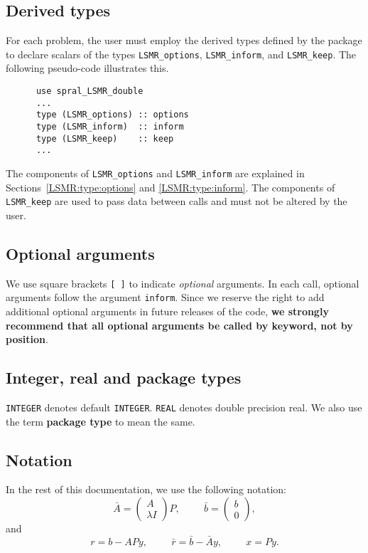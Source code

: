 \subsection{Derived types}

For each problem, the user must employ the derived types defined by the
package to declare scalars of the types
{\tt LSMR\_options}, {\tt LSMR\_inform}, and {\tt LSMR\_keep}.
The following pseudo-code illustrates this.
\begin{verbatim}
      use spral_LSMR_double
      ...
      type (LSMR_options) :: options
      type (LSMR_inform)  :: inform
      type (LSMR_keep)    :: keep
      ...
\end{verbatim}
The components of {\tt LSMR\_options} and {\tt LSMR\_inform} are explained
in Sections~\ref{LSMR:type:options} and \ref{LSMR:type:inform}.
The components of {\tt LSMR\_keep} are used to pass
data between calls and must not be altered by the user.


\subsection{Optional arguments}

We use square brackets {\tt [ ]} to indicate {\it optional} arguments.
In each
call, optional arguments follow the argument {\tt inform}.  Since we
reserve the right to add additional optional arguments in future
releases of the code, {\bf we strongly recommend that all optional
arguments be called by keyword, not by position}.

\subsection{Integer, real and package types}

{\tt INTEGER} denotes default {\tt INTEGER}.
{\tt REAL} denotes double precision real.
We also use the term {\bf package type} to mean the same.

\subsection{Notation}
In the rest of this documentation, we use the following notation:
$$
   \bar{A} = \left( \begin{array}{c}
         A \\
         \lambda I
      \end{array} \right)P, \hspace{1cm} \bar{b} = \left( \begin{array}{c}
         b \\
         0
      \end{array} \right),
$$
and
$$
   r = b - APy , \hspace{1cm}  \bar{r} = \bar{b} - \bar{A}y,
      \hspace{1cm}  x = Py.
$$


